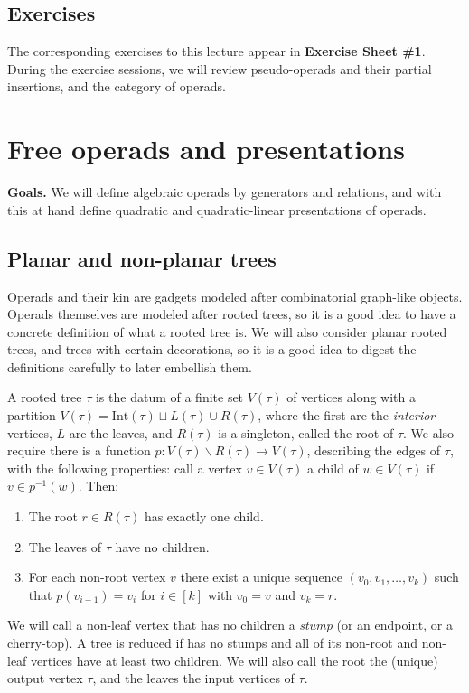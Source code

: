 \documentclass[fleqn,a4paper, twoside]{article}
\newcommand{\0}{\langle 0\rangle}
\newenvironment{tenumerate}{
 \begin{enumerate}
  \setlength{\itemsep}{0pt}
  \setlength{\parskip}{0pt}
}{\end{enumerate}}
\DeclareRobustCommand{\[}{\begin{equation}}%
\DeclareRobustCommand{\]}{\end{equation}}%
\theoremstyle{mytheorem}
\theoremstyle{introthm}
\theoremstyle{mydefinition}
\theoremstyle{mydefinition2}
\theoremstyle{plain} %
\newcommand{\?}{\,?\,}
\theoremstyle{mytheorem}
\theoremstyle{plain} %
\begin{document}
\subsection{Exercises}

The corresponding exercises to this lecture appear in \textbf{Exercise Sheet \#1}. During the exercise sessions, we will review pseudo-operads
and their partial insertions, and the category of operads. 
 
\pagebreak

\section{Free operads and presentations}

\textbf{Goals.} We will define algebraic operads
by generators and relations, and with this at
hand define quadratic and quadratic-linear
presentations of operads. 

\subsection{Planar and non-planar trees}

Operads and their kin are gadgets modeled after
combinatorial graph-like objects. Operads themselves are modeled after
rooted trees, so it is a good idea to have a concrete definition of 
what a rooted tree is. We will also consider planar rooted trees,
and trees with certain decorations, so it is a good idea to digest
the definitions carefully to later embellish them.

A rooted tree $\tau$ is the datum of a finite set $V(\tau)$
of vertices along with a partition $V(\tau) = 
\mathrm{Int}(\tau)\sqcup L(\tau) \cup R(\tau)$,
where the first are the \emph{interior} vertices, $L$ are the leaves, and $R(\tau)$ is
a singleton, called the root of $\tau$. We also require there is 
a function $p :V(\tau)\smallsetminus R(\tau) \longrightarrow V(\tau)$,
describing the edges of $\tau$, 
with the following properties: call a vertex $v\in V(\tau)$ a child 
of $w\in V(\tau)$ if $v\in p^{-1}(w)$. Then:
\begin{tenumerate}
\item The root $r\in R(\tau)$ has exactly one child.
\item The leaves of $\tau$ have no children.
\item For each non-root vertex $v$ there exist a unique sequence
$(v_0,v_1,\ldots,v_k)$ such that $p(v_{i-1}) = v_{i}$ for $i\in [k]$
with $v_0 = v$ and $v_k = r$.
\end{tenumerate}
We will call a non-leaf vertex that has no children a \emph{stump}
(or an endpoint, or a cherry-top).
A tree is reduced if has no stumps and all of its non-root and
non-leaf vertices have at least two children. We will also call
the root the (unique) output vertex $\tau$, and the leaves
the input vertices of $\tau$. 
\end{document}
